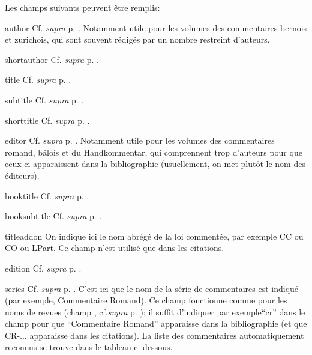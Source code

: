 \documentclass[a4paper]{ltxdockit}[2011/03/25]
\newcommand{\supra}{\emph{supra}\xspace}
\newcommand{\Cf}{\textnormal{Cf. }}
\newcommand{\cf}{cf.\xspace}
\newcommand{\GM}{\enquote}
\newcommand{\pex}{\textnormal{par exemple}\xspace}
\begin{document}
Les champs suivants peuvent être remplis:
\begin{marglist}
\item[author] \Cf \supra p. \pageref{author}. Notamment utile pour les volumes des commentaires bernois et zurichois, qui sont souvent rédigés par un nombre restreint d'auteurs. 
\item[shortauthor] \Cf \supra p. \pageref{shortauthor}.
\item[title] \Cf \supra p. \pageref{title}. 
\item[subtitle] \Cf \supra p. \pageref{subtitle}. 
\item[shorttitle] \Cf \supra p. \pageref{shorttitle}. 
\item[editor] \Cf \supra p. \pageref{editor}. Notamment utile pour les volumes des commentaires romand, bâlois et du Handkommentar, qui comprennent trop d'auteurs pour que ceux-ci apparaissent dans la bibliographie (usuellement, on met plutôt le nom des éditeurs).
\item[booktitle] \Cf \supra p. \pageref{booktitle}. 
\item[booksubtitle] \Cf \supra p. \pageref{booksubtitle}.
\item[titleaddon] On indique ici le nom abrégé de la loi commentée, \pex CC ou CO ou LPart. Ce champ n'est utilisé que dans les citations.
\item[edition] \Cf \supra p. \pageref{edition}. 
\item[series] \Cf \supra p. \pageref{series}. C'est ici que le nom de la série de commentaires est indiqué (par exemple, Commentaire Romand). Ce champ fonctionne comme pour les noms de revues (champ , \cf \supra p. \pageref{journaltitle}); il suffit d'indiquer \pex \GM{cr} dans le champ pour que \GM{Commentaire Romand} apparaisse dans la bibliographie (et que CR-... apparaisse dans les citations). La liste des commentaires automatiquement reconnus se trouve dans le tableau ci-dessous.


\end{marglist}
\end{document}
